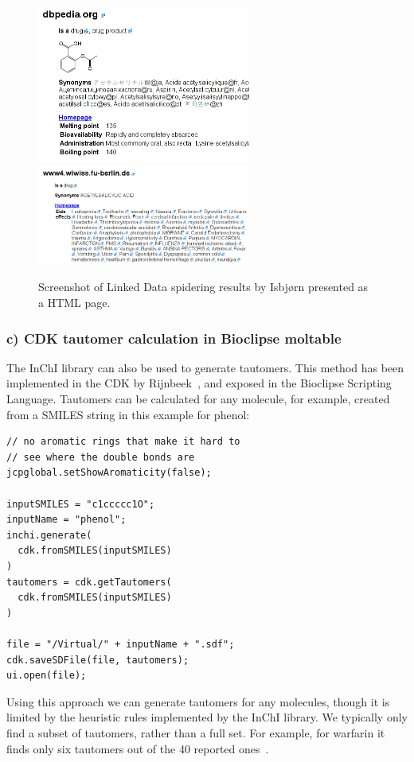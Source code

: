 \documentclass[10pt]{bmc_article}
\newenvironment{bmcformat}{\fussy\setboolean{publ}{true}}{\fussy}
\begin{document}
\begin{bmcformat}
\begin{figure}[!hb]
\begin{center}
	\includegraphics[width=7cm]{isbjorn6.png}
	\includegraphics[width=7cm]{isbjorn8.png}
\caption{Screenshot of Linked Data spidering results by Isbjørn presented as a HTML page.}
\label{fig:isbjorn}
\end{center}
\end{figure}


\subsubsection*{c) CDK tautomer calculation in Bioclipse moltable}

The InChI library can also be used to generate tautomers\cite{Thalheim2010}. This method has been
implemented in the CDK by Rijnbeek~\cite{Rijnbeek2011}, and exposed in the Bioclipse Scripting Language.
Tautomers can be calculated for any molecule, for example, created from a SMILES string in this
example for phenol:

\begin{verbatim}
// no aromatic rings that make it hard to
// see where the double bonds are
jcpglobal.setShowAromaticity(false);

inputSMILES = "c1ccccc1O";
inputName = "phenol";
inchi.generate(
  cdk.fromSMILES(inputSMILES)
)
tautomers = cdk.getTautomers(
  cdk.fromSMILES(inputSMILES)
)

file = "/Virtual/" + inputName + ".sdf";
cdk.saveSDFile(file, tautomers);
ui.open(file);
\end{verbatim}

Using this approach we can generate tautomers for any molecules, though it is limited by
the heuristic rules implemented by the InChI library. We typically only find a subset
of tautomers, rather than a full set. For example, for warfarin it finds only six tautomers
out of the 40 reported ones~\cite{Porter2010}.


\end{bmcformat}
\end{document}

